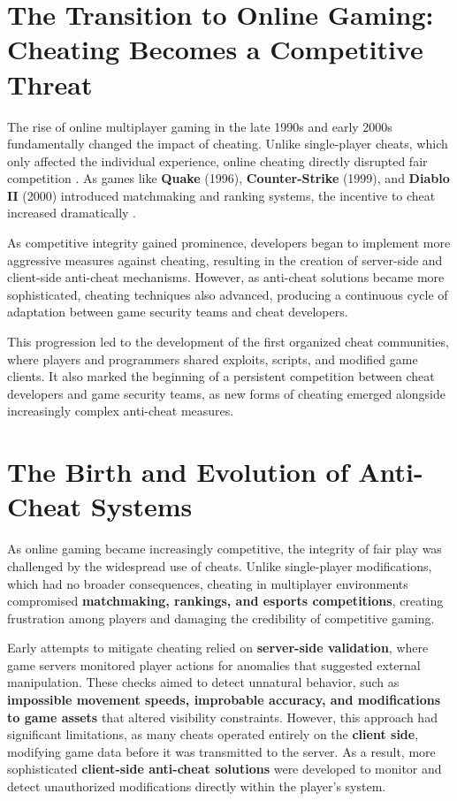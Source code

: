 \section{The Transition to Online Gaming: Cheating Becomes a Competitive Threat}

The rise of online multiplayer gaming in the late 1990s and early 2000s fundamentally changed the impact of cheating. Unlike single-player cheats, which only affected the individual experience, online cheating directly disrupted fair competition \parencite{yan2005cheats}. As games like \textbf{Quake} (1996), \textbf{Counter-Strike} (1999), and \textbf{Diablo II} (2000) introduced matchmaking and ranking systems, the incentive to cheat increased dramatically \parencite{young2016history}.

As competitive integrity gained prominence, developers began to implement more aggressive measures against cheating, resulting in the creation of server-side and client-side anti-cheat mechanisms. However, as anti-cheat solutions became more sophisticated, cheating techniques also advanced, producing a continuous cycle of adaptation between game security teams and cheat developers.

This progression led to the development of the first organized cheat communities, where players and programmers shared exploits, scripts, and modified game clients. It also marked the beginning of a persistent competition between cheat developers and game security teams, as new forms of cheating emerged alongside increasingly complex anti-cheat measures.

\section{The Birth and Evolution of Anti-Cheat Systems}

As online gaming became increasingly competitive, the integrity of fair play was challenged by the widespread use of cheats. Unlike single-player modifications, which had no broader consequences, cheating in multiplayer environments compromised \textbf{matchmaking, rankings, and esports competitions}, creating frustration among players and damaging the credibility of competitive gaming. 

Early attempts to mitigate cheating relied on \textbf{server-side validation}, where game servers monitored player actions for anomalies that suggested external manipulation. These checks aimed to detect unnatural behavior, such as \textbf{impossible movement speeds, improbable accuracy, and modifications to game assets} that altered visibility constraints. However, this approach had significant limitations, as many cheats operated entirely on the \textbf{client side}, modifying game data before it was transmitted to the server. As a result, more sophisticated \textbf{client-side anti-cheat solutions} were developed to monitor and detect unauthorized modifications directly within the player’s system.

